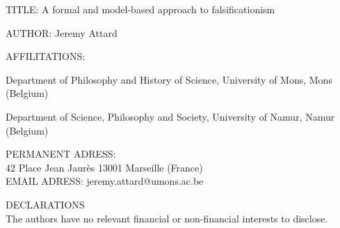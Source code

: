 \documentclass{article}%
\author{Jeremy Attard\\ Philosophy and History of Science Department, University of Mons, Mons (Belgium)\\ Department of Sciences, Philosophies and Societies, Universities of Namur, Namur (Belgium)\\ jeremy.attard@umons.ac.be
}
\begin{document}
\begin{center}
\begin{huge}

TITLE: A formal and model-based approach to falsificationism
\vspace{5mm}


AUTHOR: Jeremy Attard\\
\vspace{5mm}

AFFILITATIONS:\\
\vspace{5mm}

Department of Philosophy and History of Science, University of Mons, Mons (Belgium)\\ 
\vspace{5mm}

Department of Science, Philosophy and Society, University of Namur, Namur (Belgium)\\ 
\vspace{5mm}

PERMANENT ADRESS:\\
42 Place Jean Jaurès 13001 Marseille (France)\\

EMAIL ADRESS: jeremy.attard@umons.ac.be

DECLARATIONS\\
The authors have no relevant financial or non-financial interests to disclose.

\end{huge}
\end{center}
\end{document}
